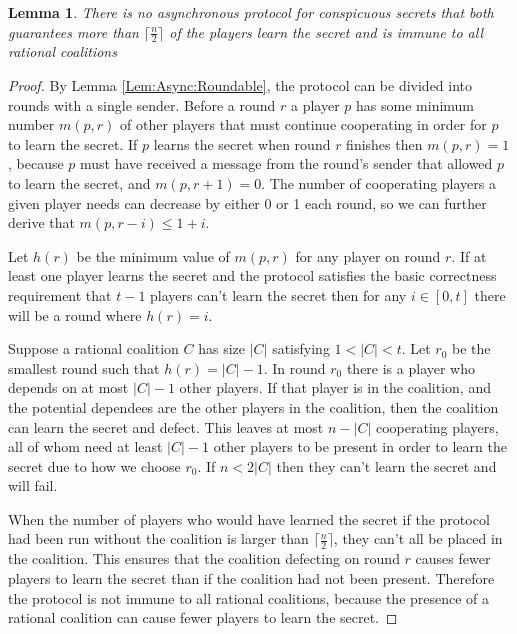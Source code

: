 \documentclass{dalcsthesis}
\newtheorem{lemma}{Lemma}
\begin{document}
\begin{lemma} There is no asynchronous protocol for conspicuous secrets that both guarantees more than $\lceil \frac{n}{2} \rceil$ of the players learn the secret and is immune to all rational coalitions \label{Lem:Async:NoConspGoodRatImmune} \end{lemma}
\begin{proof}
By Lemma \ref{Lem:Async:Roundable}, the protocol can be divided into rounds with a single sender. Before a round $r$ a player $p$ has some minimum number $m(p, r)$ of other players that must continue cooperating in order for $p$ to learn the secret. If $p$ learns the secret when round $r$ finishes then $m(p, r) = 1$, because $p$ must have received a message from the round's sender that allowed $p$ to learn the secret, and $m(p, r+1) = 0$. The number of cooperating players a given player needs can decrease by either 0 or 1 each round, so we can further derive that $m(p, r-i) \leq 1+i$.

Let $h(r)$ be the minimum value of $m(p, r)$ for any player on round $r$. If at least one player learns the secret and the protocol satisfies the basic correctness requirement that $t-1$ players can't learn the secret then for any $i \in [0, t]$ there will be a round where $h(r) = i$.

Suppose a rational coalition $C$ has size $|C|$ satisfying $1 < |C| < t$. Let $r_0$ be the smallest round such that $h(r) = |C|-1$. In round $r_0$ there is a player who depends on at most $|C|-1$ other players. If that player is in the coalition, and the potential dependees are the other players in the coalition, then the coalition can learn the secret and defect. This leaves at most $n-|C|$ cooperating players, all of whom need at least $|C|-1$ other players to be present in order to learn the secret due to how we choose $r_0$. If $n < 2 |C|$ then they can't learn the secret and will fail.

When the number of players who would have learned the secret if the protocol had been run without the coalition is larger than $\lceil \frac{n}{2} \rceil$, they can't all be placed in the coalition. This ensures that the coalition defecting on round $r$ causes fewer players to learn the secret than if the coalition had not been present. Therefore the protocol is not immune to all rational coalitions, because the presence of a rational coalition can cause fewer players to learn the secret.
\end{proof}
\end{document}
